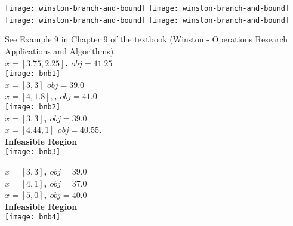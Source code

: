 \documentclass[../open-optimization/open-optimization.tex]{subfiles}
\begin{document}
\texttt{[image: winston-branch-and-bound]}
\texttt{[image: winston-branch-and-bound]}
\texttt{[image: winston-branch-and-bound]}
\texttt{[image: winston-branch-and-bound]}


\newpage


\begin{example}{}{}
See Example 9 in Chapter 9 of the textbook (Winston  - Operations Research Applications and Algorithms).\\



\textbf{$x =  [3.75, 2.25]$,  $obj =  41.25$}\\
\texttt{[image: bnb1]}\\

\textbf{$x =  [3, 3]$ $obj =  39.0$}\\
\textbf{$x =  [4,  1.8],$,  $obj =  41.0$}\\
\texttt{[image: bnb2]}\\

\textbf{$x =  [3, 3]$,  $obj =  39.0$}\\
\textbf{$x =  [4.44,  1       ]$  $obj =  40.55$.}\\
\textbf{Infeasible Region}\\
\texttt{[image: bnb3]}

\textbf{$x =  [3, 3]$,  $obj =  39.0$}\\
\textbf{$x =  [4, 1]$,  $obj =  37.0$}\\
\textbf{$x =  [5, 0]$,  $obj =  40.0$}\\
\textbf{Infeasible Region}\\
\texttt{[image: bnb4]}\\

\end{example}
\newpage
\end{document}
